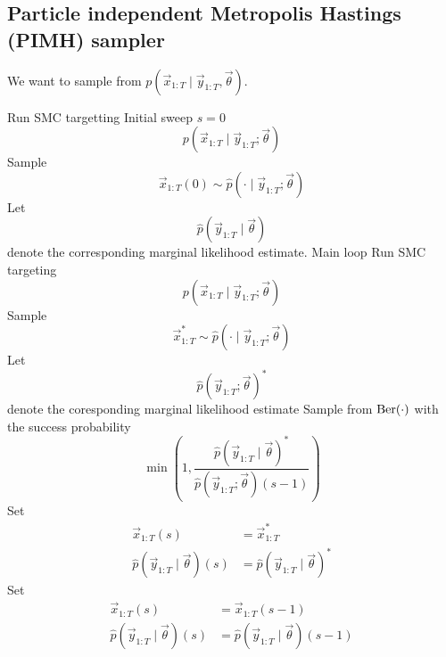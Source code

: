 \subsection{Particle independent Metropolis Hastings (PIMH) sampler}
We want to sample from $p(\vec x_{1:T} \mid \vec y_{1:T}, \vec \theta)$.
    \begin{algorithmbis}\label{alg:pimh}
        \begin{algorithmic}[1]
            \State Run SMC targetting \Comment Initial sweep $s = 0$
                $$p(\vec x_{1:T} \mid \vec y_{1:T}; \vec \theta)$$
            \State Sample
                $$\vec x_{1:T}(0) \sim \hat p(\cdot \mid \vec y_{1:T}; \vec \theta)$$
            \State Let
                $$\hat p(\vec y_{1:T} \mid \vec \theta)$$
                denote the corresponding marginal likelihood estimate.
             \Comment Main loop
                \State Run SMC targeting
                    $$p(\vec x_{1:T} \mid \vec y_{1:T}; \vec \theta)$$
                \State Sample
                    $$\vec x^\ast_{1:T} \sim \hat p(\cdot \mid \vec y_{1:T}; \vec \theta)$$
                \State Let
                    $$\hat p(\vec y_{1:T}; \vec \theta)^\ast$$
                    denote the coresponding marginal likelihood estimate
                \State Sample from $\operatorname{Ber}(\cdot)$ with the success probability
                    $$\min\left(1, \frac{\hat p(\vec y_{1:T} \mid \vec \theta)^\ast}{\hat p(\vec y_{1:T}; \vec \theta)(s - 1)}\right)$$
                    \State Set
                        \begin{align*}
                            \vec x_{1:T}(s)                             &= \vec x_{1:T}^\ast \\
                            \hat p(\vec y_{1:T} \mid \vec \theta)(s)    &= \hat p(\vec y_{1:T} \mid \vec \theta)^\ast
                        \end{align*}
                \Else
                    \State Set
                        \begin{align*}
                            \vec x_{1:T}(s)                             &= \vec x_{1:T}(s - 1) \\
                            \hat p(\vec y_{1:T} \mid \vec \theta)(s)    &= \hat p(\vec y_{1:T} \mid \vec \theta)(s - 1)
                        \end{align*}
                \EndIf
            \EndFor
        \end{algorithmic}
    \end{algorithmbis}